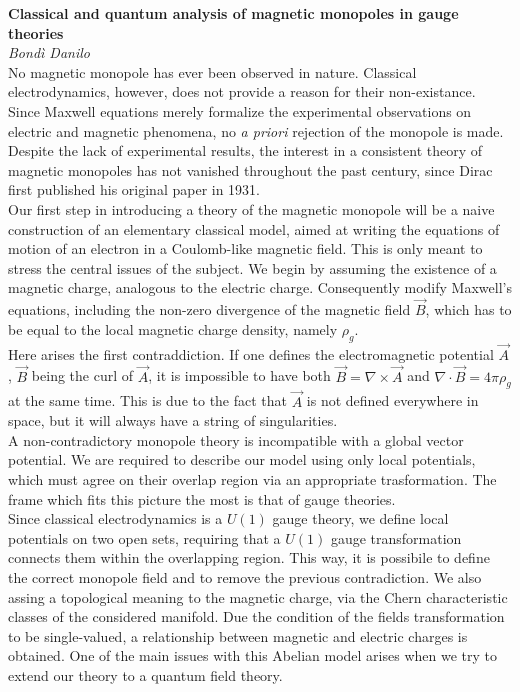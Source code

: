 


{\huge \textbf{Classical and quantum analysis of magnetic monopoles in gauge theories}}\\
{\Large \emph{Bondì Danilo}}\\


No magnetic monopole has ever been observed in nature. Classical electrodynamics,
however, does not provide a reason for their non-existance. Since Maxwell equations
merely formalize the experimental observations on electric and magnetic phenomena,
no \emph{a priori} rejection of the monopole is made.
Despite the lack of experimental results, the interest in a consistent
theory of magnetic monopoles has not vanished throughout the past century, since
Dirac first published his original paper in 1931.\\

Our first step in introducing a theory of the magnetic monopole will be a naive
construction of an elementary classical model, aimed at writing the equations of motion
of an electron in a Coulomb-like magnetic field. This is only meant to stress the
central issues of the subject.
We begin by assuming the existence of a magnetic charge, analogous to the electric
charge. Consequently modify Maxwell's equations, including the non-zero
divergence of the magnetic field $\vec B$, which has to be equal to the local
magnetic charge density, namely $\rho_g$.\\
Here arises the first contraddiction. If one defines the electromagnetic potential
$\vec A$, $\vec B$ being the curl of $\vec A$, it is impossible to have both
$\vec B = \nabla \times \vec A$ and $\nabla \cdot \vec B = 4\pi \rho_g$ at the same
time. This is due to the fact that $\vec A$ is not defined everywhere in space, but
it will always have a string of singularities.\\

A non-contradictory monopole theory is incompatible with a global vector potential.
We are required to describe our model using only local potentials, which must
agree on their overlap region via an appropriate trasformation.
The frame which fits this picture the most is that of gauge theories.\\

Since classical electrodynamics is a $U(1)$ gauge theory, we define local potentials
on two open sets, requiring that a $U(1)$ gauge transformation connects them within the
overlapping region. This way, it is possibile to define the correct monopole field
and to remove the previous contradiction. We also assing a topological meaning
to the magnetic charge, via the Chern characteristic classes of the considered manifold.
Due the condition of the fields transformation to be single-valued,
a relationship between magnetic and electric charges is obtained.
One of the main issues with this Abelian model arises when we try to
extend our theory to a quantum field theory.\\


